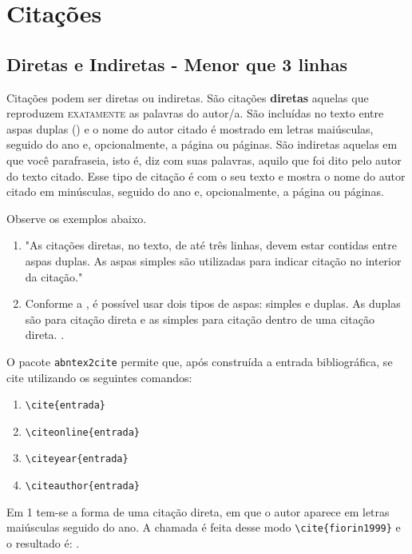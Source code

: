 \documentclass[a4paper,12pt,oneside]{memoir}
\begin{document}
\chapter{Citações} 

\section{Diretas e Indiretas - Menor que 3 linhas}

Citações podem ser diretas ou indiretas. São citações \textbf{diretas} aquelas que reproduzem \textsc{exatamente} as palavras do autor/a. São incluídas no texto entre aspas duplas (\qq{ }) e o nome do autor citado é mostrado em letras maiúsculas, seguido do ano e, opcionalmente, a página ou páginas. São indiretas aquelas em que você parafraseia, isto é, diz com suas palavras, aquilo que foi dito pelo autor do texto citado. Esse tipo de citação é  com o seu texto e mostra o nome do autor citado em minúsculas, seguido do ano e, opcionalmente, a página ou páginas.

Observe os exemplos abaixo.

\begin{enumerate}
\itemsep0em
    \item "As citações diretas, no texto, de até três linhas, devem estar contidas entre aspas duplas. As aspas simples são
utilizadas para indicar citação no interior da citação." \cite{abnt10520}
    \item Conforme a , é possível usar dois tipos de aspas: simples e duplas. As duplas são para citação direta e as simples para citação dentro de uma citação direta. .
\end{enumerate}

O pacote \verb|abntex2cite| permite que, após construída a entrada bibliográfica, se cite utilizando os seguintes comandos:

\begin{enumerate}
    \itemsep0em
    \item \verb|\cite{entrada}|
    \item \verb|\citeonline{entrada}|
    \item \verb|\citeyear{entrada}|
    \item \verb|\citeauthor{entrada}|
\end{enumerate}

Em 1 tem-se a forma de uma citação direta, em que o autor aparece em letras maiúsculas seguido do ano. A chamada é feita desse modo \verb|\cite{fiorin1999}| e o resultado é:  \cite{fiorin1999}.
\end{document}
